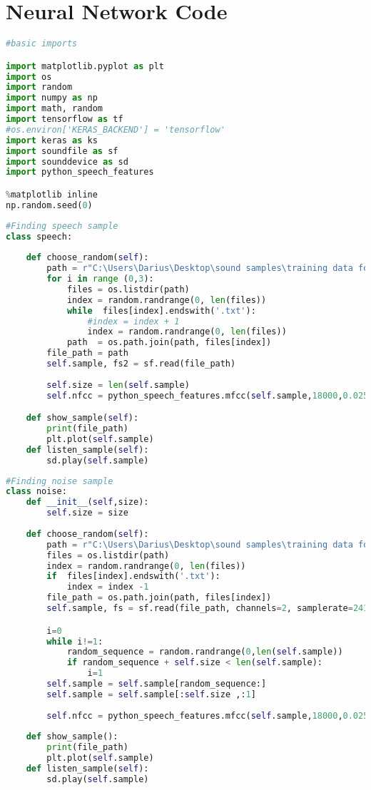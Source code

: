 \section{Neural Network Code}
\begin{lstlisting}[language=Python, label=lst:imports]
#basic imports

import matplotlib.pyplot as plt
import os
import random
import numpy as np
import math, random
import tensorflow as tf
#os.environ['KERAS_BACKEND'] = 'tensorflow'
import keras as ks
import soundfile as sf
import sounddevice as sd
import python_speech_features

%matplotlib inline
np.random.seed(0)
\end{lstlisting}

\begin{lstlisting}[language=Python, label=lst:speechsample]
#Finding speech sample
class speech:
    
    def choose_random(self):
        path = r"C:\Users\Darius\Desktop\sound samples\training data for RNN\LibriSpeech\train-clean-100"
        for i in range (0,3):
            files = os.listdir(path)
            index = random.randrange(0, len(files))
            while  files[index].endswith('.txt'):
                #index = index + 1
                index = random.randrange(0, len(files))
            path  = os.path.join(path, files[index])
        file_path = path
        self.sample, fs2 = sf.read(file_path)
        
        self.size = len(self.sample)
        self.nfcc = python_speech_features.mfcc(self.sample,18000,0.025,0.01,24)

    def show_sample(self):
        print(file_path)
        plt.plot(self.sample)
    def listen_sample(self):
        sd.play(self.sample) 
\end{lstlisting}

\begin{lstlisting}[language=Python, label=lst:noisesample]
#Finding noise sample
class noise:
    def __init__(self,size):
        self.size = size
    
    def choose_random(self):
        path = r"C:\Users\Darius\Desktop\sound samples\training data for RNN\rnnoise_contributions"
        files = os.listdir(path)
        index = random.randrange(0, len(files))
        if  files[index].endswith('.txt'):
            index = index -1
        file_path = os.path.join(path, files[index])
        self.sample, fs = sf.read(file_path, channels=2, samplerate=24100,format='RAW', subtype='PCM_16')

        i=0
        while i!=1:
            random_sequence = random.randrange(0,len(self.sample))
            if random_sequence + self.size < len(self.sample):
                i=1
        self.sample = self.sample[random_sequence:]
        self.sample = self.sample[:self.size ,:1]
        
        self.nfcc = python_speech_features.mfcc(self.sample,18000,0.025,0.01,24)
        
    def show_sample():
        print(file_path)
        plt.plot(self.sample)
    def listen_sample(self):
        sd.play(self.sample) 
\end{lstlisting}

